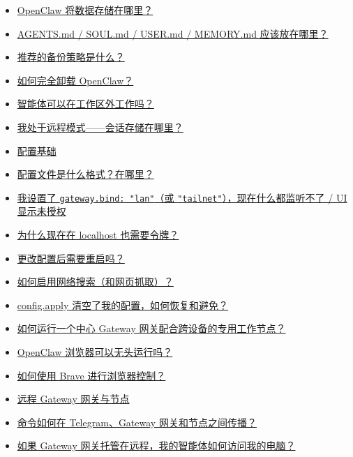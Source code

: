 \begin{itemize}
  \item \href{\#where-does-openclaw-store-its-data}{OpenClaw 将数据存储在哪里？}
  \item \href{\#where-should-agentsmd-soulmd-usermd-memorymd-live}{AGENTS.md / SOUL.md / USER.md / MEMORY.md 应该放在哪里？}
  \item \href{\#whats-the-recommended-backup-strategy}{推荐的备份策略是什么？}
  \item \href{\#how-do-i-completely-uninstall-openclaw}{如何完全卸载 OpenClaw？}
  \item \href{\#can-agents-work-outside-the-workspace}{智能体可以在工作区外工作吗？}
  \item \href{\#im-in-remote-mode-where-is-the-session-store}{我处于远程模式——会话存储在哪里？}
  \item \href{\#config-basics}{配置基础}
  \item \href{\#what-format-is-the-config-where-is-it}{配置文件是什么格式？在哪里？}
  \item \href{\#i-set-gatewaybind-lan-or-tailnet-and-now-nothing-listens-the-ui-says-unauthorized}{我设置了 \texttt{gateway.bind: "lan"}（或 \texttt{"tailnet"}），现在什么都监听不了 / UI 显示未授权}
  \item \href{\#why-do-i-need-a-token-on-localhost-now}{为什么现在在 localhost 也需要令牌？}
  \item \href{\#do-i-have-to-restart-after-changing-config}{更改配置后需要重启吗？}
  \item \href{\#how-do-i-enable-web-search-and-web-fetch}{如何启用网络搜索（和网页抓取）？}
  \item \href{\#configapply-wiped-my-config-how-do-i-recover-and-avoid-this}{config.apply 清空了我的配置，如何恢复和避免？}
  \item \href{\#how-do-i-run-a-central-gateway-with-specialized-workers-across-devices}{如何运行一个中心 Gateway 网关配合跨设备的专用工作节点？}
  \item \href{\#can-the-openclaw-browser-run-headless}{OpenClaw 浏览器可以无头运行吗？}
  \item \href{\#how-do-i-use-brave-for-browser-control}{如何使用 Brave 进行浏览器控制？}
  \item \href{\#remote-gateways-nodes}{远程 Gateway 网关与节点}
  \item \href{\#how-do-commands-propagate-between-telegram-the-gateway-and-nodes}{命令如何在 Telegram、Gateway 网关和节点之间传播？}
  \item \href{\#how-can-my-agent-access-my-computer-if-the-gateway-is-hosted-remotely}{如果 Gateway 网关托管在远程，我的智能体如何访问我的电脑？}

\end{itemize}
